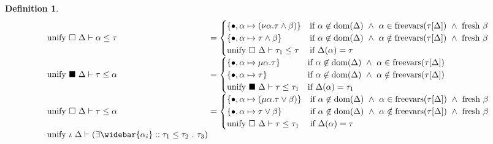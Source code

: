 \documentclass[manuscript]{acmart}
\theoremstyle{definition}
\newtheorem{definition}{Definition}[section]
\begin{document}
\begin{definition}
\[\begin{array}{l @{} l}
    \text{unify } \square\ \Delta \vdash \alpha \leq \tau	
    &{} =
    \begin{cases}  
      \{ \bullet,\alpha \mapsto (\nu\alpha.\tau \wedge \beta) \}
      & \text{if } 
      \alpha \not\in \text{dom}(\Delta) \ \wedge\
      \alpha \in \text{freevars}(\tau[\Delta]) \ \wedge\ 
      \text{fresh } \beta
      \\
      \{ \bullet,\alpha \mapsto \tau \wedge \beta \}
      & \text{if } 
      \alpha \not\in \text{dom}(\Delta) \ \wedge\
      \alpha \notin \text{freevars}(\tau[\Delta]) \ \wedge\ 
      \text{fresh } \beta
      \\
      \text{unify } \square\ \Delta \vdash \tau_1 \leq \tau
      &\text{if }
      \Delta(\alpha) = \tau
    \end{cases}
    \\
    \text{unify } \blacksquare\ \Delta \vdash \tau \leq \alpha 	
    &{} =
    \begin{cases}  
      \{ \bullet,\alpha \mapsto \mu\alpha.\tau \}
      & \text{if } 
      \alpha \not\in \text{dom}(\Delta) \ \wedge\
      \alpha \in \text{freevars}(\tau[\Delta])
      \\
      \{ \bullet,\alpha \mapsto \tau \}
      & \text{if } 
      \alpha \not\in \text{dom}(\Delta) \ \wedge\
      \alpha \notin \text{freevars}(\tau[\Delta])
      \\
      \text{unify } \blacksquare\ \Delta \vdash \tau \leq \tau_1
      &\text{if }
      \Delta(\alpha) = \tau_1
    \end{cases}
    \\
    \text{unify } \square\ \Delta \vdash \tau \leq \alpha	
    &{} =
    \begin{cases}  
      \{ \bullet,\alpha \mapsto (\mu\alpha.\tau \vee \beta) \}
      & \text{if } 
      \alpha \not\in \text{dom}(\Delta) \ \wedge\
      \alpha \in \text{freevars}(\tau[\Delta]) \ \wedge\ 
      \text{fresh } \beta
      \\
      \{ \bullet,\alpha \mapsto \tau \vee \beta \}
      & \text{if } 
      \alpha \not\in \text{dom}(\Delta) \ \wedge\
      \alpha \notin \text{freevars}(\tau[\Delta]) \ \wedge\ 
      \text{fresh } \beta
      \\
      \text{unify } \square\ \Delta \vdash \tau \leq \tau_1
      &\text{if }
      \Delta(\alpha) = \tau
    \end{cases}
    \\
    \text{unify } \iota\ \Delta \vdash
    (\exists \widebar{\alpha_i} :: \tau_1 \leq \tau_2\ .\ \tau_3)

\end{array}\]
\end{definition}
\end{document}
